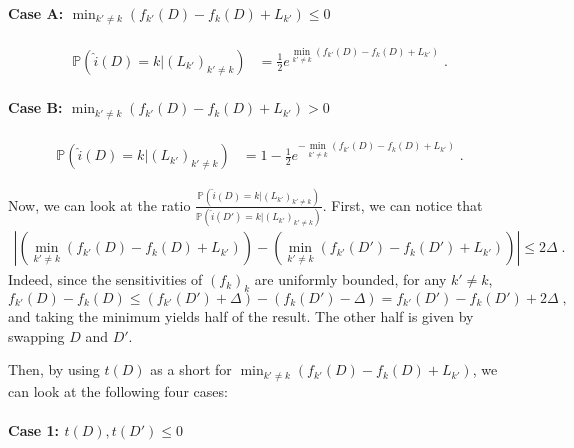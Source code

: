 \documentclass{article}
\theoremstyle{plain}
\theoremstyle{definition}
\theoremstyle{remark}
\newcommand{\Prob}[0]{\mathbb{P}}
\newcommand\p[1]{\left( {#1}\right)}
\begin{document}
\paragraph{Case A: $\min_{k' \neq k} \p{f_{k'}(D) - f_{k}(D) + L_{k'}}\leq 0$}
\begin{equation}
\label{eq:uoqshdofihquosdhfsq}
\begin{aligned}
    \Prob \p{\hat{i}(D) = k | (L_{k'})_{k' \neq k}} 
    &=
    \frac{1}{2} e^{\min_{k' \neq k} \p{f_{k'}(D) - f_{k}(D) + L_{k'}}}\;.
\end{aligned}
\end{equation}

\paragraph{Case B: $\min_{k' \neq k} \p{f_{k'}(D) - f_{k}(D) + L_{k'}} > 0$}
\begin{equation}
\label{eq:uoqshdofihquosdhfsqjndsq}
\begin{aligned}
    \Prob \p{\hat{i}(D) = k | (L_{k'})_{k' \neq k}} 
    &=
    1 - \frac{1}{2} e^{- \min_{k' \neq k} \p{f_{k'}(D) - f_{k}(D) + L_{k'}}} \;.
\end{aligned}
\end{equation}

Now, we can look at the ratio $\frac{\Prob \p{\hat{i}(D) = k | (L_{k'})_{k' \neq k}} }{\Prob \p{\hat{i}(D') = k | (L_{k'})_{k' \neq k}} }$. First, we can notice that
\begin{equation}
\label{eq:jbckvjhbihuqbisubdhfhjqsbdjhfbdhjskq}
    \begin{aligned}
        \left| \p{\min_{k' \neq k} \p{f_{k'}(D) - f_{k}(D) + L_{k'}}} - \p{\min_{k' \neq k} \p{f_{k'}(D') - f_{k}(D') + L_{k'}}} \right| \leq 2 \Delta \;.
    \end{aligned}
\end{equation}
Indeed, since the sensitivities of $(f_k)_k$ are uniformly bounded, for any $k' \neq k$,
\begin{equation}
    f_{k'}(D) - f_{k}(D) \leq (f_{k'}(D') + \Delta) - (f_{k}(D') - \Delta) = f_{k'}(D') - f_{k}(D') + 2 \Delta \;,
\end{equation}
and taking the minimum yields half of the result. The other half is given by swapping $D$ and $D'$.

Then, by using $t(D)$ as a short for $\min_{k' \neq k} \p{f_{k'}(D) - f_{k}(D) + L_{k'}}$, we can look at the following four cases:

\paragraph{Case 1: $t(D), t(D') \leq 0$}
\end{document}
